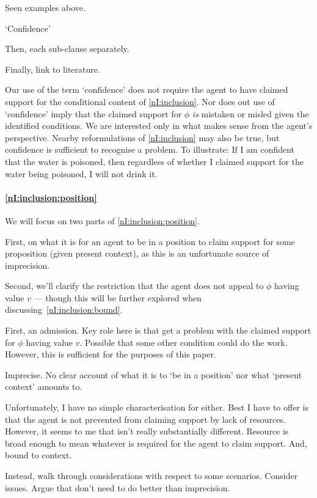 {
  \color{red}
  Seen examples above.
}

\begin{note}
  `Confidence'

  Then, each sub-clause separately.

  Finally, link to literature.
\end{note}

\begin{note}[`Confidence']
  Our use of the term `confidence' does not require the agent to have claimed support for the conditional content of \ref{nI:inclusion}.
  Nor does out use of `confidence' imply that the claimed support for \(\phi\) \emph{is} mistaken or misled given the identified conditions.
  We are interested only in what makes sense from the agent's perspective.
  Nearby reformulations of \ref{nI:inclusion} may also be true, but confidence is sufficient to recognise a problem.
  To illustrate: If I am confident that the water is poisoned, then regardless of whether I claimed support for the water being poisoned, I will not drink it.
\end{note}

\paragraph{\ref{nI:inclusion:position}}

\begin{note}
  We will focus on two parts of \ref{nI:inclusion:position}.

  First, on what it is for an agent to be in a position to claim support for some proposition (given present context), as this is an unfortunate source of imprecision.

  Second, we'll clarify the restriction that the agent does not appeal to \(\phi\) having value \(v\) --- though this will be further explored when discussing~\ref{nI:inclusion:bound}.
\end{note}

\begin{note}
  First, an admission.
  Key role here is that get a problem with the claimed support for \(\phi\) having value \(v\).
  Possible that some other condition could do the work.
  However, this is sufficient for the purposes of this paper.
\end{note}

\begin{note}
  Imprecise.
  No clear account of what it is to `be in a position' nor what `present context' amounts to.

  Unfortunately, I have no simple characterisation for either.
  Best I have to offer is that the agent is not prevented from claiming support by lack of resources.
  However, it seems to me that isn't really substantially different.
  Resource is broad enough to mean whatever is required for the agent to claim support.
  And, bound to context.

  Instead, walk through considerations with respect to some scenarios.
  Consider issues.
  Argue that don't need to do better than imprecision.
\end{note}

